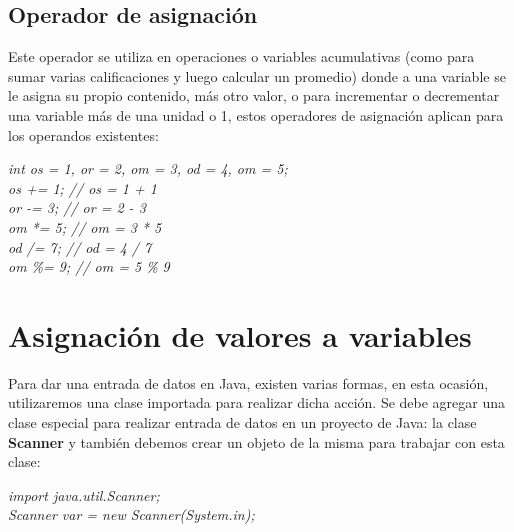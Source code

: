 \subsection{Operador de asignación}
\hspace{0.55cm}Este operador se utiliza en operaciones o variables acumulativas (como para sumar varias calificaciones y luego calcular un promedio) donde a una variable se le asigna su propio contenido, más otro valor, o para incrementar o decrementar una variable más de una unidad o 1, estos operadores de asignación aplican para los operandos existentes:
\begin{center}
    \textit{
		int os = 1, or = 2, om = 3, od = 4, om = 5; \\
		os += 1; // os = 1 + 1 \\
		or -= 3; // or = 2 - 3 \\
		om *= 5; // om = 3 * 5 \\
		od /= 7; // od = 4 / 7 \\
		om \%= 9; // om = 5 \% 9
	}
\end{center}



\section{Asignación de valores a variables}
\hspace{0.55cm}Para dar una entrada de datos en Java, existen varias formas, en esta ocasión, utilizaremos una clase importada para realizar dicha acción. Se debe agregar una clase especial para realizar entrada de datos en un proyecto de Java: la clase \textbf{Scanner} y también debemos crear un objeto de la misma para trabajar con esta clase:
\begin{center}
	\textit{
		import java.util.Scanner; \\
		Scanner var = new Scanner(System.in);
	}
\end{center}

